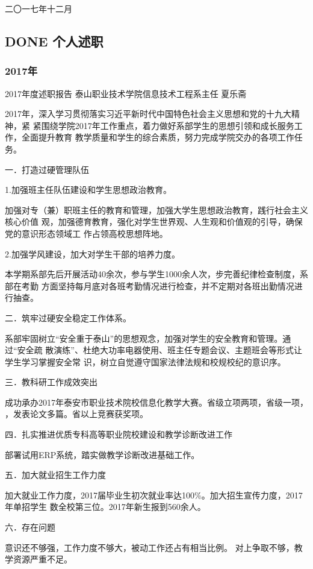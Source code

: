 \documentclass[11pt]{ctexart}
\begin{document}
{{{{二〇一七年十二月


\subsection{{\bfseries\sffamily DONE} 个人述职}
\label{sec:orgc17c091}
\subsubsection{2017年}
\label{sec:org8263c3c}
2017年度述职报告
泰山职业技术学院信息技术工程系主任 夏乐斋

2017年，深入学习贯彻落实习近平新时代中国特色社会主义思想和党的十九大精神，紧
紧围绕学院2017年工作重点，着力做好系部学生的思想引领和成长服务工作，全面提升教育
教学质量和学生的综合素质，努力完成学院交办的各项工作任务。

一．打造过硬管理队伍

1.加强班主任队伍建设和学生思想政治教育。

加强对专（兼）职班主任的教育和管理，加强大学生思想政治教育，践行社会主义核心价值
观，加强德育教育，强化对学生世界观、人生观和价值观的引导，确保党的意识形态领域工
作占领高校思想阵地。

2.加强学风建设，加大对学生干部的培养力度。

本学期系部先后开展活动40余次，参与学生1000余人次，步完善纪律检查制度，系部在考勤
方面坚持每月底对各班考勤情况进行检查，并不定期对各班出勤情况进行抽查。


二．筑牢过硬安全稳定工作体系。

系部牢固树立“安全重于泰山”的思想观念，加强对学生的安全教育和管理。通过“安全疏
散演练”、杜绝大功率电器使用、班主任专题会议、主题班会等形式让学生学习掌握安全常
识，树立自觉遵守国家法律法规和校规校纪的意识序。

三．教科研工作成效突出

成功承办2017年泰安市职业技术院校信息化教学大赛。省级立项两项，省级一项，
，发表论文多篇。省以上竞赛获奖项。

四．扎实推进优质专科高等职业院校建设和教学诊断改进工作

部署试用ERP系统，踏实做教学诊断改进基础工作。

五．加大就业招生工作力度

加大就业工作力度，2017届毕业生初次就业率达100\%。加大招生宣传力度，2017年单招学生
数全校第三位。2017年新生报到560余人。


六．存在问题

意识还不够强，工作力度不够大，被动工作还占有相当比例。
对上争取不够，教学资源严重不足。


}}}}
\end{document}
